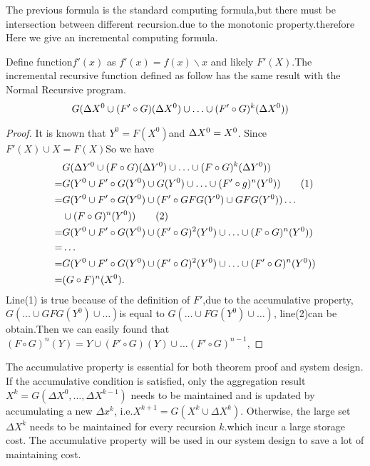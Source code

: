 {\color{red} The previous formula is the standard computing formula,but there must be intersection between different recursion.due to the monotonic property.therefore Here we give an incremental computing formula.
	\begin{theorem}
		Define function$f'(x)$ as $f'(x)=f(x)\backslash x$ and likely $F'(X)$.The incremental recursive function defined as follow has the same result with the Normal Recursive program. 
	 \begin{align}
	 	&G(\Delta X^0\cup (F'\circ G)(\Delta X^0)\cup\ldots\cup (F'\circ G)^k(\Delta X^0))\notag 
	 \end{align}
	\end{theorem}
 \begin{proof}
 	It is known that $Y^0=F(X^0)$and $\Delta X^0=X^0\\$. Since $F'(X)\cup X=F(X)$So we have
 	\begin{align}
 	&G(\Delta Y^0\cup (F\circ G)(\Delta Y^0)\cup\ldots\cup (F\circ G)^k(\Delta Y^0))\notag \\
 	=&G(Y^0\cup F'\circ G(Y^0)\cup G(Y^0)\cup \ldots \cup (F'\circ g)^n(Y^0))    \tag{1}\\
 	=&G(Y^0\cup F'\circ G(Y^0)\cup(F'\circ GFG(Y^0) \cup GFG(Y^0)) \ldots \notag \\ &\cup (F\circ G)^n(Y^0)) \tag{2}\\
 	=&G(Y^0\cup F'\circ G(Y^0)\cup (F'\circ G)^2(Y^0)\cup \ldots \cup (F\circ G)^n(Y^0))\notag\\
 	=& \ldots \notag \\
 	=&G(Y^0\cup F'\circ G(Y^0)\cup (F'\circ G)^2(Y^0)\cup \ldots \cup (F'\circ G)^n(Y^0))\notag\\
 	=&(G \circ F)^n(X^0).\notag
 	\end{align}
 	Line(1) is true because of the definition of $F'$,due to the accumulative property, $G(\ldots \cup GFG(Y^0)\cup \ldots)$is equal to $G(\ldots \cup FG(Y^0)\cup \ldots)$, line(2)can be obtain.Then we can easily found that $(F \circ G)^n(Y)=Y \cup (F'\circ G)(Y)\cup \ldots(F' \circ G)^{n-1}$,
 \end{proof}
}
 The accumulative property is essential for both theorem proof and system design. If the accumulative condition is satisfied, only the aggregation result $X^k=G(\Delta X^{0},\ldots,\Delta X^{k-1})$ needs to be maintained and is updated by accumulating a new $\Delta x^{k}$, i.e.$X^{k+1}=G(X^k \cup \Delta X^k)$. Otherwise, the large set $\Delta X^{k}$ needs to be maintained for every recursion $k$.which incur a large storage cost. The accumulative property will be used in our system design to save a lot of maintaining cost.

